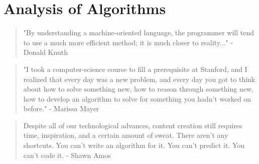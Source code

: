 \documentclass[openany,a4paper,12pt]{book}
\begin{document}
\chapter{Analysis of Algorithms}
\begin{quotation}"By understanding a machine-oriented language, the programmer will tend to use a much more efficient method; it is much closer to reality..." - Donald Knuth
\end{quotation}
\begin{quotation}"I took a computer-science course to fill a prerequisite at Stanford, and I realized that every day was a new problem, and every day you got to think about how to solve something new, how to reason through something new, how to develop an algorithm to solve for something you hadn't worked on before." - Marissa Mayer
\end{quotation}
\begin{quotation}
Despite all of our technological advances, content creation still requires time, inspiration, and a certain amount of sweat. There aren't any shortcuts. You can't write an algorithm for it. You can't predict it. You can't code it. - Shawn Amos
\end{quotation}

\newpage
\end{document}
